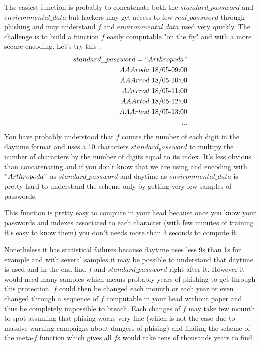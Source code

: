 \documentclass[11pt]{article}
\begin{document}
The easiest function is probably to concatenate both the $standard\_password$ and $environmental\_data$ but hackers may get access to few $real\_password$ through phishing and may understand $f$ and $environmental\_data$ used very quickly.
The challenge is to build a function $f$ easily computable "on the fly" and with a more secure encoding. Let's try this :\\
\begin{equation}
\begin{split}
\mbox{$standard\_password="Arthropoda"$}\\
AAAroda\mbox{ 18/05-09:00}\\
AAArrod\mbox{ 18/05-10:00}\\
AArrrod\mbox{ 18/05-11:00}\\
AAArtod\mbox{ 18/05-12:00}\\
AAArhod\mbox{ 18/05-13:00}\\
...
\end{split}
\end{equation}
You have probably understood that $f$ counts the number of each digit in the daytime format and uses a 10 characters $standard_password$ to multipy the number of characters by the number of digits equal to its index. It's less obvious than concatenating and if you don't know that we are using and encoding with $"Arthropoda"$ as $standard\_password$ and daytime as $environmental\_data$ is pretty hard to understand the scheme only by getting very few samples of passwords.

This function is pretty easy to compute in your head because once you know your passwords and indexes associated to each character (with few minutes of training it's easy to know them) you don't needs more than 3 seconds to compute it.

Nonetheless it has statistical failures because daytime uses less 9s than 1s for example and with several samples it may be possible to understand that daytime is used and in the end find $f$ and $standard\_password$ right after it. However it would need many samples which means probably years of phishing to get through this protection. $f$ could then be changed each mounth or each year or even changed through a sequence of $f$ computable in your head without paper and thus be completely impossible to breach. Each changes of $f$ may take few mounth to spot assuming that phising works very fine (which is not the case due to massive warning campaigns about dangers of phising) and finding the scheme of the meta-$f$ function which gives all $f$s would take tens of thousands years to find.
\end{document}
